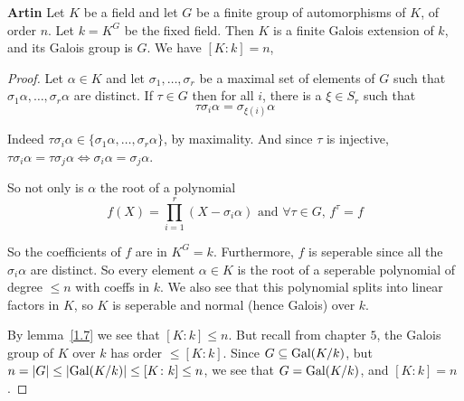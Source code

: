 \begin{theorem}\textbf{Artin}
    Let $K$ be a field and let $G$ be a finite group of automorphisms of $K$, of order $n$. Let $k = K^G$ be the fixed field. Then $K$ is a finite Galois extension of $k$, and its Galois group is $G$. We have $[K\colon k] = n$,

    \begin{proof}
        Let $\alpha\in K$ and let $\sigma_1,\ldots,\sigma_r$ be a maximal set of elements of $G$ such that $\sigma_1\alpha,\ldots,\sigma_r\alpha$ are distinct. If $\tau\in G$ then for all $i$, there is a $\xi\in S_r$ such that\[\tau\sigma_i\alpha = \sigma_{\xi(i)}\alpha\]
    
        Indeed $\tau\sigma_i\alpha\in \{\sigma_1\alpha,\ldots,\sigma_r\alpha\}$, by maximality. And since $\tau$ is injective, $\tau\sigma_i\alpha = \tau\sigma_j\alpha\iff \sigma_i\alpha = \sigma_j\alpha$.
  
        So not only is $\alpha$ the root of a polynomial \[f(X) = \prod_{i=1}^r (X-\sigma_i\alpha) \text{ and }\forall \tau\in G \text{, }f^\tau = f \]

        So the coefficients of $f$ are in $K^G = k$. Furthermore, $f$ is seperable since all the $\sigma_i\alpha$ are distinct. So every element $\alpha\in K$ is the root of a seperable polynomial of degree $\leq n$ with coeffs in $k$. We also see that this polynomial splits into linear factors in $K$, so $K$ is seperable and normal (hence Galois) over $k$.

        By lemma~\ref{1.7} we see that $[K\colon k]\leq n$. But recall from chapter $5$, the Galois group of $K$ over $k$ has order $\leq [K\colon k]$. Since $G\subseteq \text{Gal}(K/k)$, but $n = |G| \leq |\text{Gal}(K/k)|\leq [K\colon k]\leq n$, we see that $G = \text{Gal}(K/k)$, and $[K\colon k] = n$. 
    \end{proof}
 \end{theorem}
\printindex
